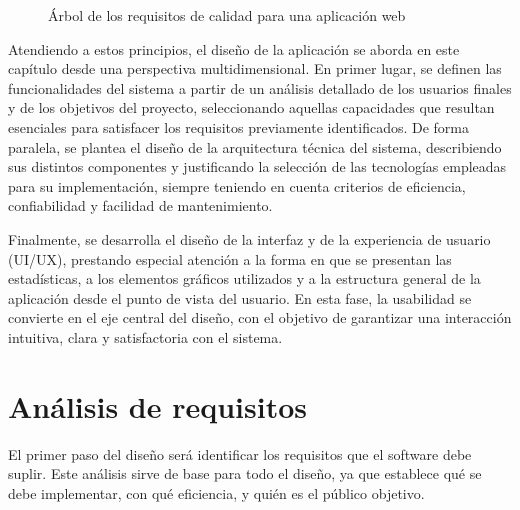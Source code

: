 \begin{figure}[ht]
\centering
\hspace*{-1.2cm}
\caption{Árbol de los requisitos de calidad para una aplicación web}
\label{fig:Elementos de calidad para una aplicación web}
\end{figure}

Atendiendo a estos principios, el diseño de la aplicación se aborda en este capítulo desde una perspectiva multidimensional. En primer lugar, se definen las funcionalidades del sistema a partir de un análisis detallado de los usuarios finales y de los objetivos del proyecto, seleccionando aquellas capacidades que resultan esenciales para satisfacer los requisitos previamente identificados. De forma paralela, se plantea el diseño de la arquitectura técnica del sistema, describiendo sus distintos componentes y justificando la selección de las tecnologías empleadas para su implementación, siempre teniendo en cuenta criterios de eficiencia, confiabilidad y facilidad de mantenimiento.

Finalmente, se desarrolla el diseño de la interfaz y de la experiencia de usuario (UI/UX), prestando especial atención a la forma en que se presentan las estadísticas, a los elementos gráficos utilizados y a la estructura general de la aplicación desde el punto de vista del usuario. En esta fase, la usabilidad se convierte en el eje central del diseño, con el objetivo de garantizar una interacción intuitiva, clara y satisfactoria con el sistema.

\section{Análisis de requisitos}

El primer paso del diseño será identificar los requisitos que el software debe suplir. Este análisis sirve de base para todo el diseño, ya que establece qué se debe implementar, con qué eficiencia, y quién es el público objetivo. 

